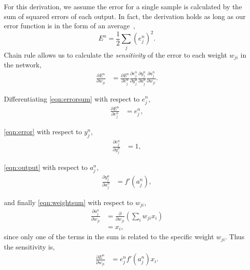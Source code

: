 \documentclass[thesis]{subfiles}
\begin{document}
For this derivation, we assume the error for a single sample is calculated by the sum of squared errors of each output. In fact, the derivation holds as long as our error function is in the form of an average~\citep{Bishop1995},
\begin{equation}
    E^n = \frac{1}{2} \sum_j {\left(e^n_j\right)}^2.
    \label{eqn:errorsum}
\end{equation}
Chain rule allows us to calculate the \emph{sensitivity} of the error to each weight $w_{ji}$ in the network,
\begin{equation}
\begin{aligned}
    \frac{\partial E^n}{\partial w_{ji}} &= \frac{\partial E^n}{\partial e^n_j}\frac{\partial e^n_j}{\partial y^n_j} \frac{\partial y^n_j}{\partial a^n_j} \frac{\partial a^n_j}{\partial w_{ji}}.
\end{aligned}
\end{equation}

Differentiating \cref{eqn:errorsum} with respect to $e^n_j$,
\begin{equation}
\begin{aligned}
    \frac{\partial E^n}{\partial e^n_j} &= e^n_j,
\end{aligned}
\end{equation}

\cref{eqn:error} with respect to $y^n_j$,
\begin{equation}
\begin{aligned}
    \frac{\partial e^n_j}{\partial y^n_j} &= 1,
\end{aligned}
\end{equation}

\cref{eqn:output} with respect to $a^n_j$,
\begin{equation}
\begin{aligned}
   \frac{\partial y^n_j}{\partial a^n_j}  &= f'\left( a^n_j \right),
\end{aligned}
\label{eqn:partialdyda}
\end{equation}

and finally \cref{eqn:weightsum} with respect to $w_{ji}$,
\begin{equation}
\begin{aligned}
   \frac{\partial a^n_j}{\partial w_{ji}} &= \frac{\partial}{\partial w_{ji}} \left( \sum_i w_{ji} x_{i} \right)\\
   &= x_i,
\end{aligned}
\label{eqn:sumonetermpartial}
\end{equation}
since only one of the terms in the sum is related to the specific weight $w_{ji}$. Thus the sensitivity is,
\begin{equation}
\label{eqn:deltasensitivity}
\begin{aligned}
    \frac{\partial E^n}{\partial w_{ji}} &= e^n_j  f'\left( a^n_j \right) x_i.
\end{aligned}
\end{equation}
\end{document}
